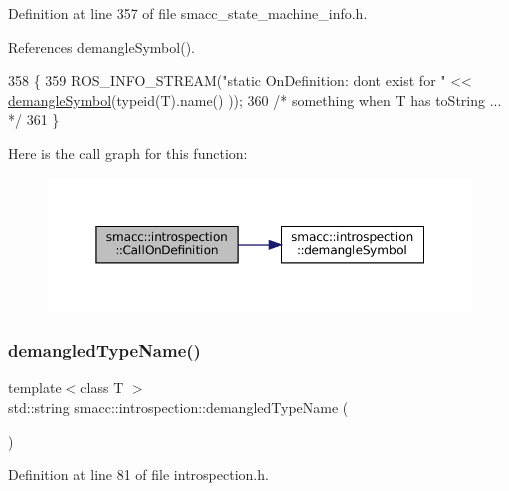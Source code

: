 Definition at line 357 of file smacc\+\_\+state\+\_\+machine\+\_\+info.\+h.



References demangle\+Symbol().


\begin{DoxyCode}
358 \{
359     ROS\_INFO\_STREAM(\textcolor{stringliteral}{"static OnDefinition: dont exist for "} << \hyperlink{namespacesmacc_1_1introspection_a2f495108db3e57604d8d3ff5ef030302}{demangleSymbol}(\textcolor{keyword}{typeid}(T).name()
      ));
360     \textcolor{comment}{/* something when T has toString ... */}
361 \}
\end{DoxyCode}
Here is the call graph for this function\+:
\nopagebreak
\begin{figure}[H]
\begin{center}
\leavevmode
\includegraphics[width=350pt]{namespacesmacc_1_1introspection_a8cfcfc9c8896a6ff4bf22dbce6ecf838_cgraph}
\end{center}
\end{figure}
\mbox{\label{namespacesmacc_1_1introspection_af1b3277706c3299b589c3fa801169286}} 
\subsubsection{\texorpdfstring{demangled\+Type\+Name()}{demangledTypeName()}}
{\footnotesize\ttfamily template$<$class T $>$ \\
std\+::string smacc\+::introspection\+::demangled\+Type\+Name (\begin{DoxyParamCaption}{ }\end{DoxyParamCaption})\hspace{0.3cm}{\ttfamily [inline]}}



Definition at line 81 of file introspection.\+h.



